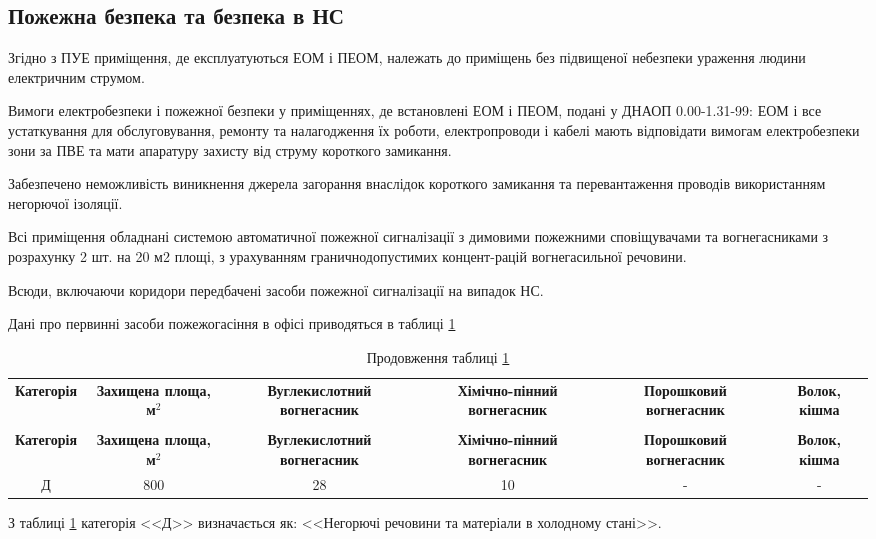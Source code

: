 \subsection{Пожежна безпека та безпека в НС}
\par Згідно з ПУЕ приміщення, де експлуатуються ЕОМ і ПЕОМ, належать до приміщень без підвищеної небезпеки ураження людини електричним струмом.
\par Вимоги електробезпеки і пожежної безпеки у приміщеннях, де встановлені ЕОМ і ПЕОМ, подані у ДНАОП 0.00-1.31-99: ЕОМ і все устаткування для обслуговування, ремонту та налагодження їх роботи, електропроводи і кабелі мають відповідати вимогам електробезпеки зони за ПВЕ та мати апаратуру захисту від струму короткого замикання.

\par Забезпечено неможливість виникнення джерела загорання внаслідок короткого замикання та перевантаження проводів використанням негорючої ізоляції.

\par Всі приміщення обладнані системою автоматичної пожежної сигналізації з димовими пожежними сповіщувачами та вогнегасниками з розрахунку 2 шт. на 20 м2 площі, з урахуванням граничнодопустимих концент-рацій вогнегасильної речовини.

\par Всюди, включаючи коридори передбачені засоби пожежної сигналізації на випадок НС.

\par Дані про первинні засоби пожежогасіння в офісі приводяться в таблиці \ref{t:safety_vogon}

{\footnotesize
\begin{longtable}{|c|c|c|c|c|c|}
\captionsetup{justification=centering}
\caption{первинні засоби пожежогасіння}\label{t:safety_vogon}\\
\hline
\multicolumn{1}{|c|}{\textbf{Категорія}}&
\multicolumn{1}{p{2cm}|}{\textbf{Захищена площа, м$^2$}}&
\multicolumn{1}{p{3cm}|}{\textbf{Вуглекислотний вогнегасник}}&
\multicolumn{1}{p{2cm}|}{\textbf{Хімічно-пінний вогнегасник}}&
\multicolumn{1}{p{3cm}|}{\textbf{Порошковий вогнегасник}}&
\multicolumn{1}{p{3cm}|}{\textbf{Волок, кішма }}\\ \hline

\endfirsthead
\caption*{\hfill Продовження таблиці \ref{t:safety_vogon}}\\ \hline

\multicolumn{1}{|c|}{\textbf{Категорія}}&
\multicolumn{1}{p{2cm}|}{\textbf{Захищена площа, м$^2$}}&
\multicolumn{1}{p{3cm}|}{\textbf{Вуглекислотний вогнегасник}}&
\multicolumn{1}{p{2cm}|}{\textbf{Хімічно-пінний вогнегасник}}&
\multicolumn{1}{p{3cm}|}{\textbf{Порошковий вогнегасник}}&
\multicolumn{1}{p{3cm}|}{\textbf{Волок, кішма }}\\ \hline
\endhead

Д & 800 & 28  & 10 & - & - \\ \hline
\end{longtable}
}

\par З таблиці \ref{t:safety_vogon} категорія <<Д>> визначається як: <<Негорючі речовини та матеріали в холодному стані>>.